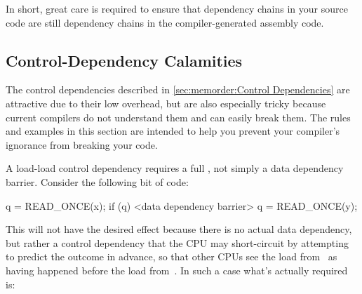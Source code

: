 \QuickQuizEnd

In short, great care is required to ensure that dependency
chains in your source code are still dependency chains in the
compiler-generated assembly code.

\subsection{Control-Dependency Calamities}
\label{sec:memorder:Control-Dependency Calamities}

The control dependencies described in
\cref{sec:memorder:Control Dependencies}
are attractive due to their low overhead, but are also especially
tricky because current compilers do not understand them and can easily
break them.
The rules and examples in this section are intended to help you
prevent your compiler's ignorance from breaking your code.

A load-load control dependency requires a full ,
not simply a data dependency barrier.
Consider the following bit of code:

\begin{VerbatimN}
q = READ_ONCE(x);
if (q) {
	<data dependency barrier>
	q = READ_ONCE(y);
}
\end{VerbatimN}

This will not have the desired effect because there is no actual data
dependency, but rather a control dependency that the CPU may short-circuit
by attempting to predict the outcome in advance, so that other CPUs see
the load from~ as having happened before the load from~.
In such a case what's actually required is:

